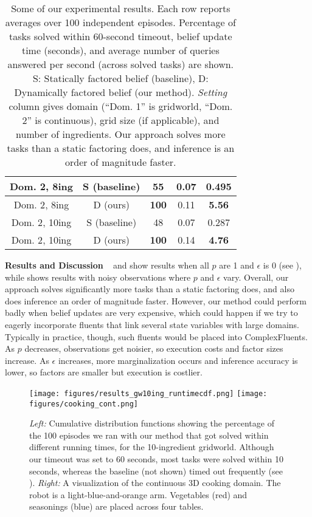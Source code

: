 \begin{table}[t]
{{\begin{tabular}{c|c|c|c|c}
    Dom. 2, 8ing & S (baseline) & 55 & 0.07 & 0.495\\
    \midrule
    Dom. 2, 8ing & D (ours) & \textbf{100} & 0.11 & \textbf{5.56}\\
    \midrule
    Dom. 2, 10ing & S (baseline) & 48 & 0.07 & 0.287\\
    \midrule
    Dom. 2, 10ing & D (ours) & \textbf{100} & 0.14 & \textbf{4.76}\\
    \bottomrule[1.5pt]
  \end{tabular}}}
\caption{Some of our experimental results. Each row reports averages
  over 100 independent episodes. Percentage of tasks solved within
  60-second timeout, belief update time (seconds), and average number
  of queries answered per second (across solved tasks) are shown. S:
  Statically factored belief (baseline), D: Dynamically factored
  belief (our method). \emph{Setting} column gives domain (``Dom. 1''
  is gridworld, ``Dom. 2'' is continuous), grid size (if applicable),
  and number of ingredients. Our approach solves more tasks than a
  static factoring does, and inference is an order of magnitude
  faster.}
\label{table:results}
\end{table}

\textbf{Results and Discussion} \  and
 show results when all $p$ are 1 and $\epsilon$ is
0 (see ), while 
shows results with noisy observations where $p$ and $\epsilon$
vary. Overall, our approach solves significantly more tasks than a
static factoring does, and also does inference an order of magnitude
faster. However, our method could perform badly when belief
updates are very expensive, which could happen if we try to eagerly
incorporate fluents that link several state variables with large
domains. Typically in practice, though, such fluents would be placed
into ComplexFluents. As $p$ decreases, observations get
noisier, so execution costs and factor sizes increase. As $\epsilon$
increases, more marginalization occurs and inference accuracy is
lower, so factors are smaller but execution is costlier.

\begin{figure}[t]
  \vspace{0.6em}
  \centering
  \noindent
  \texttt{[image: figures/results\_gw10ing\_runtimecdf.png]}
  \texttt{[image: figures/cooking\_cont.png]}
  \caption{\emph{Left:} Cumulative distribution functions showing the
    percentage of the 100 episodes we ran with our method that got
    solved within different running times, for the 10-ingredient
    gridworld. Although our timeout was set to 60 seconds, most tasks
    were solved within 10 seconds, whereas the baseline (not shown)
    timed out frequently (see ). \emph{Right:} A visualization of the
    continuous 3D cooking domain. The robot is a light-blue-and-orange
    arm. Vegetables (red) and seasonings (blue) are placed across four
    tables.}
  \label{fig:results}
\end{figure}

